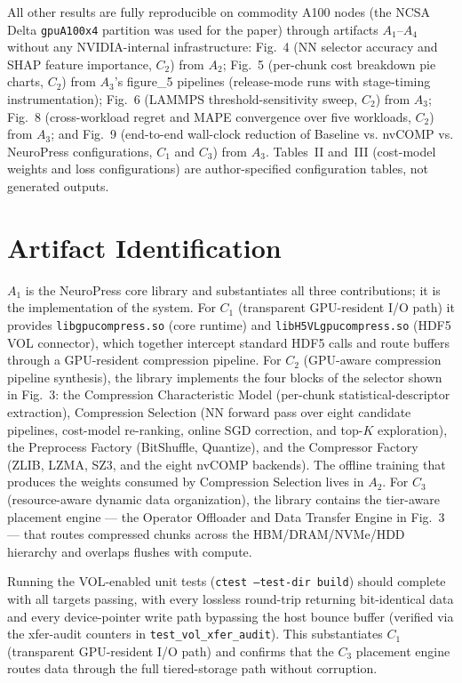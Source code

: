 \documentclass[conference]{IEEEtran}
\begin{document}
All other results are fully reproducible on commodity A100
nodes (the NCSA Delta \texttt{gpuA100x4} partition was used
for the paper) through artifacts $A_1$--$A_4$ without any
NVIDIA-internal infrastructure:
Fig.~4 (NN selector accuracy and SHAP feature importance,
$C_2$) from $A_2$;
Fig.~5 (per-chunk cost breakdown pie charts, $C_2$) from
$A_3$'s figure\_5 pipelines (release-mode runs with
stage-timing instrumentation);
Fig.~6 (LAMMPS threshold-sensitivity sweep, $C_2$) from $A_3$;
Fig.~8 (cross-workload regret and MAPE convergence over five
workloads, $C_2$) from $A_3$; and
Fig.~9 (end-to-end wall-clock reduction of Baseline vs.
nvCOMP vs. NeuroPress configurations, $C_1$ and $C_3$) from
$A_3$. Tables~II and~III (cost-model weights and loss
configurations) are author-specified configuration tables,
not generated outputs.


\section{Artifact Identification}


\newartifact

\artrel
$A_1$ is the NeuroPress core library and substantiates all
three contributions; it is the implementation of the system.
For $C_1$ (transparent GPU-resident I/O path) it provides
\texttt{libgpucompress.so} (core runtime) and
\texttt{libH5VLgpucompress.so} (HDF5 VOL connector), which
together intercept standard HDF5 calls and route buffers
through a GPU-resident compression pipeline. For $C_2$
(GPU-aware compression pipeline synthesis), the library
implements the four blocks of the selector shown in Fig.~3:
the Compression Characteristic Model (per-chunk
statistical-descriptor extraction), Compression Selection (NN
forward pass over eight candidate pipelines, cost-model
re-ranking, online SGD correction, and top-$K$ exploration),
the Preprocess Factory (BitShuffle, Quantize), and the
Compressor Factory (ZLIB, LZMA, SZ3, and the eight nvCOMP
backends). The offline training that produces the weights
consumed by Compression Selection lives in $A_2$. For $C_3$
(resource-aware dynamic data organization), the library
contains the tier-aware placement engine --- the Operator
Offloader and Data Transfer Engine in Fig.~3 --- that routes
compressed chunks across the HBM/DRAM/NVMe/HDD hierarchy and
overlaps flushes with compute.

\artexp
Running the VOL-enabled unit tests (\texttt{ctest --test-dir
build}) should complete with all targets passing, with every
lossless round-trip returning bit-identical data and every
device-pointer write path bypassing the host bounce buffer
(verified via the xfer-audit counters in
\texttt{test\_vol\_xfer\_audit}). This substantiates $C_1$
(transparent GPU-resident I/O path) and confirms that the $C_3$
placement engine routes data through the full tiered-storage
path without corruption.
\end{document}
